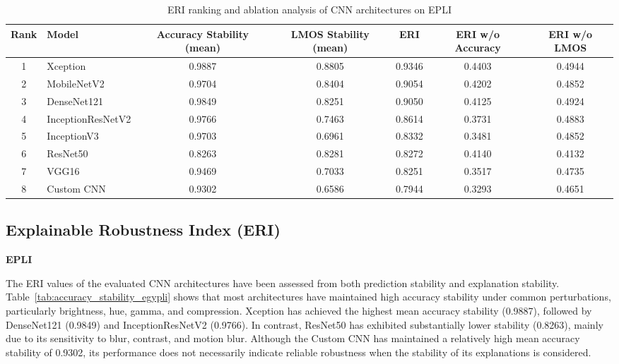 \documentclass[a4paper,fleqn]{cas-dc}
\begin{document}
\begin{table}[t]
\centering
\caption{ERI ranking and ablation analysis of CNN architectures on EPLI}
\label{tab:eri_ablation_ranking_egypli}

\scriptsize
\setlength{\tabcolsep}{5pt}
\renewcommand{\arraystretch}{1.15}

\begin{tabular}{|c|l|c|c|c|c|c|}
\hline
\textbf{Rank} &
\textbf{Model} &
\textbf{Accuracy Stability (mean)} &
\textbf{LMOS Stability (mean)} &
\textbf{ERI} &
\textbf{ERI w/o Accuracy} &
\textbf{ERI w/o LMOS} \\
\hline

1 & Xception
&0.9887&0.8805&0.9346&0.4403&0.4944\\

2 & MobileNetV2
&0.9704&0.8404&0.9054&0.4202&0.4852\\

3 & DenseNet121
&0.9849&0.8251&0.9050&0.4125&0.4924\\

4 & InceptionResNetV2
&0.9766&0.7463&0.8614&0.3731&0.4883\\

5 & InceptionV3
&0.9703&0.6961&0.8332&0.3481&0.4852\\

6 & ResNet50
&0.8263&0.8281&0.8272&0.4140&0.4132\\

7 & VGG16
&0.9469&0.7033&0.8251&0.3517&0.4735\\

8 & Custom CNN
&0.9302&0.6586&0.7944&0.3293&0.4651\\

\hline
\end{tabular}
\end{table}


\subsection{Explainable Robustness Index (ERI)}

\noindent\textbf{EPLI}

The ERI values of the evaluated CNN architectures have been assessed from both prediction stability and explanation stability. Table~\ref{tab:accuracy_stability_egypli} shows that most architectures have maintained high accuracy stability under common perturbations, particularly brightness, hue, gamma, and compression. Xception has achieved the highest mean accuracy stability (0.9887), followed by DenseNet121 (0.9849) and InceptionResNetV2 (0.9766). In contrast, ResNet50 has exhibited substantially lower stability (0.8263), mainly due to its sensitivity to blur, contrast, and motion blur. Although the Custom CNN has maintained a relatively high mean accuracy stability of 0.9302, its performance does not necessarily indicate reliable robustness when the stability of its explanations is considered.
\end{document}
